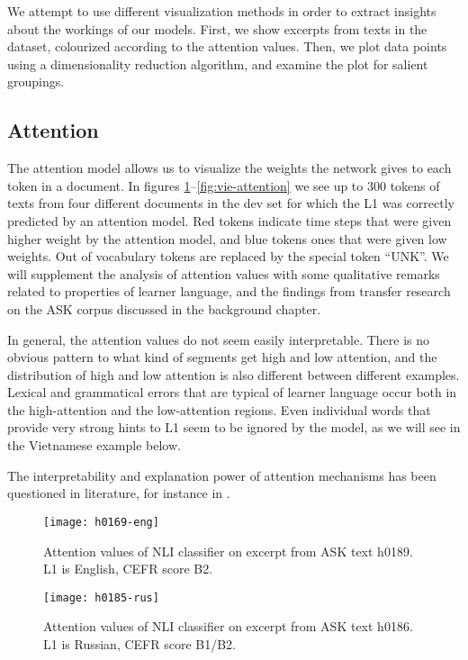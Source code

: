 We attempt to use different visualization methods in order to extract
insights about the workings of our models. First, we show excerpts from texts
in the dataset, colourized according to the attention values. Then, we plot
data points using a dimensionality reduction algorithm, and examine the plot
for salient groupings.


\subsection{Attention} \label{subsec:attentionvis}

The attention model allows us to visualize the weights the network gives to
each token in a document. In figures
\ref{fig:eng-attention}--\ref{fig:vie-attention} we see up to 300 tokens of
texts from four different documents in the dev set for which the L1 was
correctly predicted by an attention model. Red tokens indicate time steps
that were given higher weight by the attention model, and blue tokens ones
that were given low weights. Out of vocabulary tokens are replaced by the
special token ``UNK''. We will supplement the analysis of attention values
with some qualitative remarks related to properties of learner language, and
the findings from transfer research on the ASK corpus discussed in the
background chapter.

In general, the attention values do not seem easily interpretable. There is
no obvious pattern to what kind of segments get high and low attention, and
the distribution of high and low attention is also different between
different examples. Lexical and grammatical errors that are typical of
learner language occur both in the high-attention and the low-attention
regions. Even individual words that provide very strong hints to \ac{L1} seem
to be ignored by the model, as we will see in the Vietnamese example below.

The interpretability and explanation power of attention mechanisms has been
questioned in literature, for instance in \textcite{attentionexplanation}.

\begin{figure}
  \centering
  \texttt{[image: h0169-eng]}
  \caption[Attention in a text by an English speaker]{
    Attention values of NLI classifier on excerpt from ASK text h0189. L1 is
    English, CEFR score B2.
  }
  \label{fig:eng-attention}
\end{figure}

\begin{figure}
  \centering
  \texttt{[image: h0185-rus]}
  \caption[Attention in a text by a Russian speaker]{
    Attention values of NLI classifier on excerpt from ASK text h0186. L1 is
    Russian, CEFR score B1/B2.
  }
  \label{fig:rus-attention}
\end{figure}

